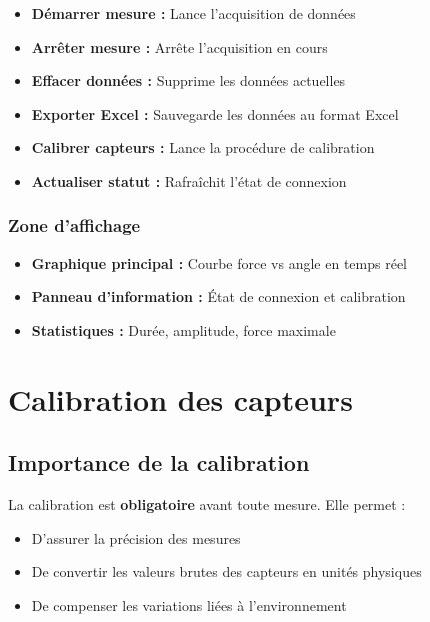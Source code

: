 \documentclass[12pt,a4paper]{article}
\begin{document}
\begin{itemize}
    \item \textbf{Démarrer mesure :} Lance l'acquisition de données
    \item \textbf{Arrêter mesure :} Arrête l'acquisition en cours
    \item \textbf{Effacer données :} Supprime les données actuelles
    \item \textbf{Exporter Excel :} Sauvegarde les données au format Excel
    \item \textbf{Calibrer capteurs :} Lance la procédure de calibration
    \item \textbf{Actualiser statut :} Rafraîchit l'état de connexion
\end{itemize}

\subsubsection{Zone d'affichage}

\begin{itemize}
    \item \textbf{Graphique principal :} Courbe force vs angle en temps réel
    \item \textbf{Panneau d'information :} État de connexion et calibration
    \item \textbf{Statistiques :} Durée, amplitude, force maximale
\end{itemize}

\section{Calibration des capteurs}

\subsection{Importance de la calibration}

La calibration est \textbf{obligatoire} avant toute mesure. Elle permet :
\begin{itemize}
    \item D'assurer la précision des mesures
    \item De convertir les valeurs brutes des capteurs en unités physiques
    \item De compenser les variations liées à l'environnement
\end{itemize}
\end{document}
